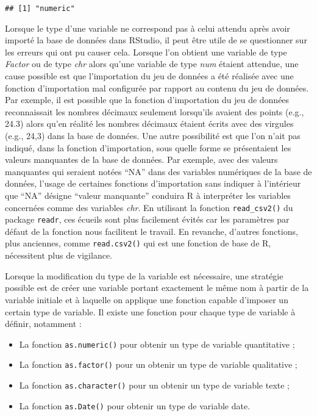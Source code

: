 \documentclass[
  french,
]{book}
\providecommand{\tightlist}{%
  \setlength{\itemsep}{0pt}\setlength{\parskip}{0pt}}
\begin{document}
\begin{verbatim}
## [1] "numeric"
\end{verbatim}

Lorsque le type d'une variable ne correspond pas à celui attendu après avoir importé la base de données dans RStudio, il peut être utile de se questionner sur les erreurs qui ont pu causer cela. Lorsque l'on obtient une variable de type \emph{Factor} ou de type \emph{chr} alors qu'une variable de type \emph{num} étaient attendue, une cause possible est que l'importation du jeu de données a été réalisée avec une fonction d'importation mal configurée par rapport au contenu du jeu de données. Par exemple, il est possible que la fonction d'importation du jeu de données reconnaissait les nombres décimaux seulement lorsqu'ils avaient des points (e.g., 24.3) alors qu'en réalité les nombres décimaux étaient écrits avec des virgules (e.g., 24,3) dans la base de données. Une autre possibilité est que l'on n'ait pas indiqué, dans la fonction d'importation, sous quelle forme se présentaient les valeurs manquantes de la base de données. Par exemple, avec des valeurs manquantes qui seraient notées \enquote{NA} dans des variables numériques de la base de données, l'usage de certaines fonctions d'importation sans indiquer à l'intérieur que \enquote{NA} désigne \enquote{valeur manquante} conduira R à interpréter les variables concernées comme des variables \emph{chr}. En utilisant la fonction \texttt{read\_csv2()} du package \texttt{readr}, ces écueils sont plus facilement évités car les paramètres par défaut de la fonction nous facilitent le travail. En revanche, d'autres fonctions, plus anciennes, comme \texttt{read.csv2()} qui est une fonction de base de R, nécessitent plus de vigilance.

Lorsque la modification du type de la variable est nécessaire, une stratégie possible est de créer une variable portant exactement le même nom à partir de la variable initiale et à laquelle on applique une fonction capable d'imposer un certain type de variable. Il existe une fonction pour chaque type de variable à définir, notamment :

\begin{itemize}
\tightlist
\item
  La fonction \texttt{as.numeric()} pour obtenir un type de variable quantitative ;
\item
  La fonction \texttt{as.factor()} pour un obtenir un type de variable qualitative ;
\item
  La fonction \texttt{as.character()} pour un obtenir un type de variable texte ;
\item
  La fonction \texttt{as.Date()} pour obtenir un type de variable date.
\end{itemize}
\end{document}

